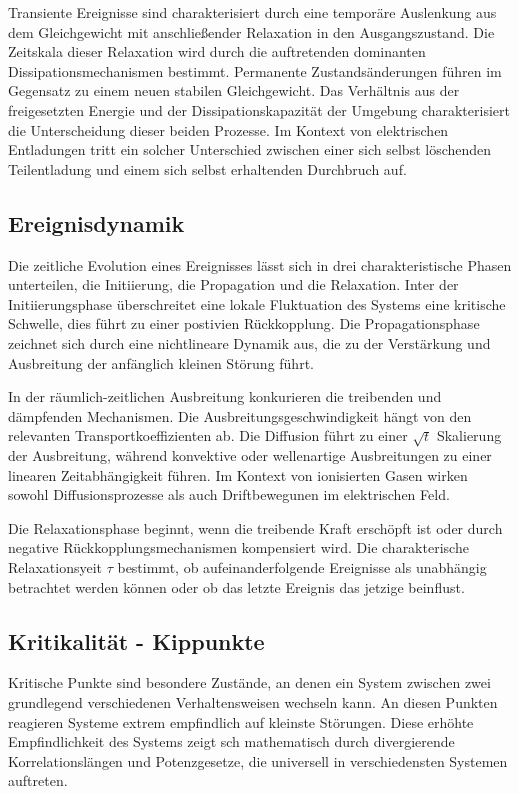 Transiente Ereignisse sind charakterisiert durch eine temporäre Auslenkung aus dem Gleichgewicht mit anschließender Relaxation in den Ausgangszustand. Die Zeitskala dieser Relaxation wird durch die auftretenden dominanten Dissipationsmechanismen bestimmt. Permanente Zustandsänderungen führen im Gegensatz zu einem neuen stabilen Gleichgewicht. Das Verhältnis aus der freigesetzten Energie und der Dissipationskapazität der Umgebung charakterisiert die Unterscheidung dieser beiden Prozesse. Im Kontext von elektrischen Entladungen tritt ein solcher Unterschied zwischen einer sich selbst löschenden Teilentladung und einem sich selbst erhaltenden Durchbruch auf.

\subsection{Ereignisdynamik}
Die zeitliche Evolution eines Ereignisses lässt sich in drei charakteristische Phasen unterteilen, die Initiierung, die Propagation und die Relaxation. Inter der Initiierungsphase überschreitet eine lokale Fluktuation des Systems eine kritische Schwelle, dies führt zu einer postivien Rückkopplung. Die Propagationsphase zeichnet sich durch eine nichtlineare Dynamik aus, die zu der Verstärkung und Ausbreitung der anfänglich kleinen Störung führt.

In der räumlich-zeitlichen Ausbreitung konkurieren die treibenden und dämpfenden Mechanismen. Die Ausbreitungsgeschwindigkeit hängt von den relevanten Transportkoeffizienten ab. Die Diffusion führt zu einer \(\sqrt{t}\) Skalierung der Ausbreitung, während konvektive oder wellenartige Ausbreitungen zu einer linearen Zeitabhängigkeit führen. Im Kontext von ionisierten Gasen wirken sowohl Diffusionsprozesse als auch Driftbewegunen im elektrischen Feld. \cite{Crank} 

Die Relaxationsphase beginnt, wenn die treibende Kraft erschöpft ist oder durch negative Rückkopplungsmechanismen kompensiert wird. Die charakterische Relaxationsyeit \(\tau\) bestimmt, ob aufeinanderfolgende Ereignisse als unabhängig betrachtet werden können oder ob das letzte Ereignis das jetzige beinflust.

\subsection{Kritikalität - Kippunkte}
\label{sec:critpoint}
Kritische Punkte sind besondere Zustände, an denen ein System zwischen zwei grundlegend verschiedenen Verhaltensweisen wechseln kann. An diesen Punkten reagieren Systeme extrem empfindlich auf kleinste Störungen. Diese erhöhte Empfindlichkeit des Systems zeigt sch mathematisch durch divergierende Korrelationslängen und Potenzgesetze, die universell in verschiedensten Systemen auftreten. 

